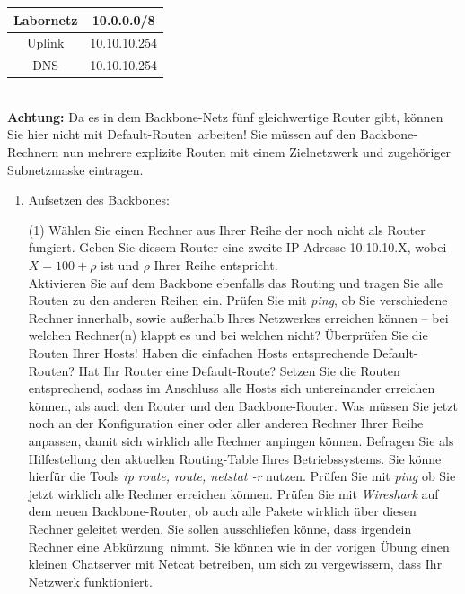 \documentclass[paper=a4,fontsize=11pt]{scrartcl}%
\numberwithin{equation}{section}
\begin{document}
\begin{enumerate}
\begin{table}[H]
\begin{tabular}{|c|c|}
 Labornetz & 10.0.0.0/8 \\ \hline
 Uplink & 10.10.10.254 \\ \hline
 DNS & 10.10.10.254 \\ \hline
\end{tabular}
\end{table} 
\vskip0.05in ~\\
\textbf{Achtung:} Da es in dem Backbone-Netz fünf gleichwertige Router gibt, können Sie hier nicht mit \glqq Default-Routen\grqq\ arbeiten! Sie müssen auf den Backbone-Rechnern nun mehrere explizite Routen mit einem Zielnetzwerk und zugehöriger Subnetzmaske eintragen.
\begin{enumerate}
	\item Aufsetzen des Backbones:
\begin{tasks}(1)
	\task Wählen Sie einen Rechner aus Ihrer Reihe der noch nicht als Router fungiert. Geben Sie diesem Router eine zweite IP-Adresse 10.10.10.X, wobei $X=100 + \rho$ ist und $\rho$ Ihrer Reihe entspricht.\\
	\task Aktivieren Sie auf dem Backbone ebenfalls das Routing und tragen Sie alle Routen zu den anderen Reihen ein.
	\task Prüfen Sie mit \emph{ping}, ob Sie verschiedene Rechner innerhalb, sowie außerhalb Ihres Netzwerkes erreichen können -- bei welchen Rechner(n) klappt es und bei welchen nicht?
	\task Überprüfen Sie die Routen Ihrer Hosts! Haben die einfachen Hosts entsprechende Default-Routen? Hat Ihr Router eine Default-Route? Setzen Sie die Routen entsprechend, sodass im Anschluss alle Hosts sich untereinander erreichen können, als auch den Router und den Backbone-Router.
	\task Was müssen Sie jetzt noch an der Konfiguration einer oder aller anderen Rechner Ihrer Reihe anpassen, damit sich wirklich alle Rechner anpingen können.
	\task Befragen Sie als Hilfestellung den aktuellen Routing-Table Ihres Betriebssystems. Sie könne hierfür die Tools \emph{ip route, route, netstat -r} nutzen.
	\task Prüfen Sie mit \emph{ping} ob Sie jetzt wirklich alle Rechner erreichen können.
	\task Prüfen Sie mit \emph{Wireshark} auf dem neuen Backbone-Router, ob auch alle Pakete wirklich über diesen Rechner geleitet werden. Sie sollen ausschließen könne, dass irgendein Rechner eine \glqq Abkürzung\grqq\ nimmt.
	\task Sie können wie in der vorigen Übung einen kleinen Chatserver mit Netcat betreiben, um sich zu vergewissern, dass Ihr Netzwerk funktioniert.
\end{tasks}
\end{enumerate}


\end{enumerate}
\end{document}
